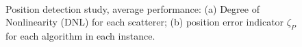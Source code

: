 \documentclass{IEEEtran}
\begin{document}
                \begin{figure}[!htb]
                    \centering
                     \\
                    \caption{Position detection study, average performance: (a) Degree of Nonlinearity (DNL) for each scatterer; (b) position error indicator $\zeta_P$ for each algorithm in each instance.}
                    \label{fig:position:average}   
                \end{figure}
\end{document}

